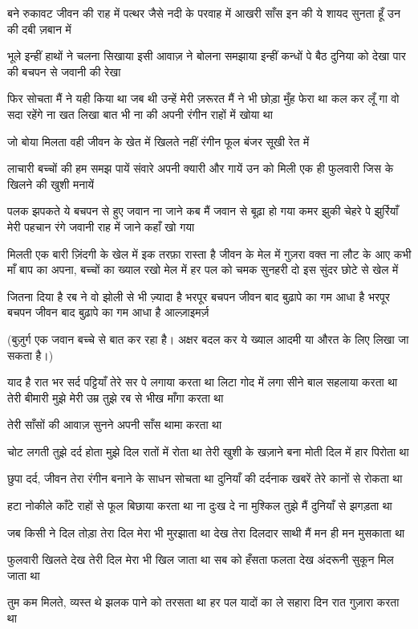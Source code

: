 बने रुकावट जीवन की राह में
पत्थर जैसे नदी के परवाह में
आखरी साँस इन की ये शायद
सुनता हूँ उन की दबी ज़बान में


भूले इन्हीं हाथों ने चलना सिखाया
इसी आवाज़ ने बोलना समझाया
इन्हीं कन्धों पे बैठ दुनिया को देखा
पार की बचपन से जवानी की रेखा

फिर सोचता मैं ने यही किया था
जब थी उन्हें मेरी ज़रूरत
मैं ने भी छोड़ा मुँह फेरा था
कल कर लूँ गा वो सदा रहेंगे
ना खत लिखा बात भी ना की
अपनी रंगीन राहों में खोया था

जो बोया मिलता वही जीवन के खेत में
खिलते नहीं रंगीन फूल बंजर सूखी रेत में

लाचारी बच्चों की हम समझ पायें
संवारे अपनी क्यारी और गायें
उन को मिली एक ही फुलवारी
जिस के खिलने की खुशी मनायें




पलक झपकते ये बचपन से हुए जवान
ना जाने कब मैं जवान से बूढ़ा हो गया
कमर झुकी चेहरे पे झुर्रियाँ मेरी पहचान
रंगे जवानी राह में जाने कहाँ खो गया

मिलती एक बारी ज़िंदगी के खेल में
इक तरफ़ा रास्ता है जीवन के मेल में
गुज़रा वक्त ना लौट के आए कभी
माँ बाप का अपना, बच्चों का
ख्याल रखो मेल में
हर पल को चमक सुनहरी दो
इस सुंदर छोटे से खेल में

जितना दिया है रब ने
वो झोली से भी ज़्यादा है
भरपूर बचपन जीवन बाद
बुढ़ापे का गम आधा है
भरपूर बचपन जीवन बाद
बुढ़ापे का गम आधा है
आल्ज़ाइमर्ज़

(बुज़ुर्ग एक जवान बच्चे से बात कर रहा है।
अक्षर बदल कर ये ख्याल आदमी या औरत
के लिए लिखा जा सकता है।)

याद है रात भर सर्द पट्टियाँ तेरे सर पे लगाया
करता था
लिटा गोद में लगा सीने बाल सहलाया करता
था
तेरी बीमारी मुझे मेरी उम्र तुझे
रब से भीख माँगा करता था

तेरी साँसों की आवाज़ सुनने
अपनी साँस थामा करता था

चोट लगती तुझे दर्द होता मुझे
दिल रातों में रोता था
तेरी खुशी के खज़ाने बना मोती
दिल में हार पिरोता था

छुपा दर्द, जीवन तेरा रंगीन
बनाने के साधन सोचता था
दुनियाँ की दर्दनाक खबरें
तेरे कानों से रोकता था

हटा नोकीले काँटे राहों से
फूल बिछाया करता था
ना दुःख दे ना मुश्किल तुझे
मैं दुनियाँ से झगड़ता था


जब किसी ने दिल तोड़ा तेरा
दिल मेरा भी मुरझाता था
देख तेरा दिलदार साथी
मैं मन ही मन मुसकाता था

फुलवारी खिलते देख तेरी
दिल मेरा भी खिल जाता था
सब को हँसता फलता देख
अंदरूनी सुकून मिल जाता था


तुम कम मिलते, व्यस्त थे
झलक पाने को तरसता था
हर पल यादों का ले सहारा
दिन रात गुज़ारा करता था

